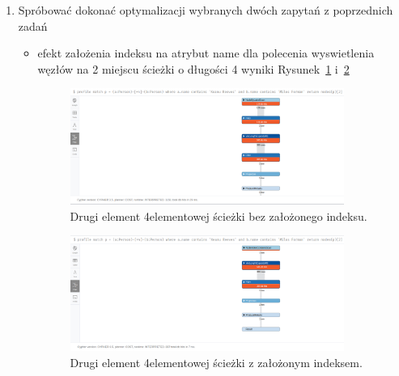 \documentclass[a4paper,9pt]{extarticle}	%
\begin{document}
\begin{enumerate}
 \newpage 
  \item Spróbować dokonać optymalizacji wybranych dwóch zapytań z poprzednich zadań
    \begin{itemize}
      \item efekt założenia indeksu na atrybut name dla polecenia wyswietlenia węzłów na 2 miejscu ścieżki o długości 4 \ppauza wyniki Rysunek~\ref{scrn:9a} i~\ref{scrn:9b}
  \begin{figure}[ht]
    \centering
    \includegraphics[width=0.9\textwidth]{screeny/9a.png}
    \caption{Drugi element 4\dywiz{}elementowej ścieżki bez założonego indeksu.}
    \label{scrn:9a}
  \end{figure}
  
  \begin{figure}[ht]
    \centering
    \includegraphics[width=0.9\textwidth]{screeny/9b.png}
    \caption{Drugi element 4\dywiz{}elementowej ścieżki z założonym indeksem.}
    \label{scrn:9b}
  \end{figure}
      

\end{itemize}
\end{enumerate}
\end{document}
